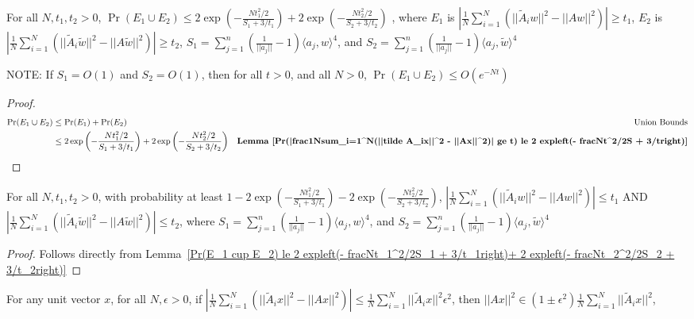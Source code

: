\begin{lemma}
\label{Pr(E_1 cup E_2) le 2 expleft(- fracNt_1^2/2S_1 + 3/t_1right)+ 2 expleft(- fracNt_2^2/2S_2 + 3/t_2right)}
    For all $N, t_1, t_2 > 0$, $\Pr(E_1 \cup E_2) \le 2 \exp\left(- \frac{Nt_1^2/2}{S_1 + 3/t_1}\right)+ 2 \exp\left(- \frac{Nt_2^2/2}{S_2 + 3/t_2}\right)$ , where $E_1$ is $|\frac{1}{N}\sum_{i=1}^N(||\tilde A_i w||^2 - ||A w||^2)| \ge t_1$, $E_2$ is $|\frac{1}{N}\sum_{i=1}^N(||\tilde A_i \tilde w||^2 - ||A \tilde w||^2)| \ge t_2$, $S_1 = \sum_{j=1}^n (\frac{1}{||a_j||} - 1)  \langle a_j, w\rangle ^4$, and $S_2 = \sum_{j=1}^n (\frac{1}{||a_j||} - 1)  \langle a_j, \tilde w\rangle ^4$
\end{lemma}

NOTE: If $S_1 = O(1)$ and $S_2 = O(1)$, then for all $t>0$, and all $N > 0$, $\Pr(E_1 \cup E_2) \le O(e^{-Nt})$ 

\begin{proof}
    \begin{align*}
        \Pr(E_1 \cup E_2) &\le \Pr (E_1) + \Pr(E_2) & \text{Union Bounds}\\
        &\le 2 \exp\left(- \frac{Nt_1^2/2}{S_1 + 3/t_1}\right)+ 2 \exp\left(- \frac{Nt_2^2/2}{S_2 + 3/t_2}\right) & \textbf{Lemma~\ref{Pr(|frac1Nsum_i=1^N(||tilde A_ix||^2 - ||Ax||^2)| ge t) le 2 expleft(- fracNt^2/2S + 3/tright)}}
    \end{align*}
\end{proof}

\begin{lemma}
\label{|frac1Nsum_i=1^N(||tilde A_i w||^2 - ||A w||^2)| le t_1 AND |frac1Nsum_i=1^N(||tilde A_i tilde w||^2 - ||A tilde w||^2)| le t_2}
    For all $N, t_1, t_2 > 0$, with probability at least $1 - 2 \exp\left(- \frac{Nt_1^2/2}{S_1 + 3/t_1}\right) - 2 \exp\left(- \frac{Nt_2^2/2}{S_2 + 3/t_2}\right)$, $|\frac{1}{N}\sum_{i=1}^N(||\tilde A_i w||^2 - ||A w||^2)| \le t_1$ AND $|\frac{1}{N}\sum_{i=1}^N(||\tilde A_i \tilde w||^2 - ||A \tilde w||^2)| \le t_2$, where $S_1 = \sum_{j=1}^n (\frac{1}{||a_j||} - 1)  \langle a_j, w\rangle ^4$, and $S_2 = \sum_{j=1}^n (\frac{1}{||a_j||} - 1)  \langle a_j, \tilde w\rangle ^4$
\end{lemma}

\begin{proof}
    Follows directly from Lemma~\ref{Pr(E_1 cup E_2) le 2 expleft(- fracNt_1^2/2S_1 + 3/t_1right)+ 2 expleft(- fracNt_2^2/2S_2 + 3/t_2right)}
\end{proof}

\begin{lemma}
\label{||Ax||^2 in (1 pm epsilon^2)frac1Nsum_i=1^N||tilde A_i x||^2}
    For any unit vector $x$, for all $N, \epsilon > 0$, if $|\frac{1}{N}\sum_{i=1}^N(||\tilde A_i x||^2 - ||A x||^2)| \le \frac{1}{N}\sum_{i=1}^N||\tilde A_i x||^2  \epsilon^2$, then $||Ax||^2 \in (1 \pm \epsilon^2)\frac{1}{N}\sum_{i=1}^N||\tilde A_i x||^2$, 
\end{lemma}

